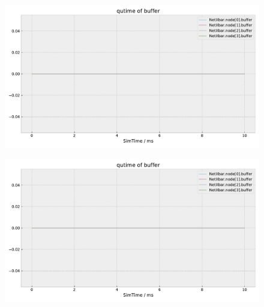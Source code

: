 \documentclass[]{scrartcl}
\begin{document}
\begin{figure}[H]
    \centering
    \includegraphics[width=\columnwidth, page=7]{../../python/results/postopt-General-0}
    \caption{}%
    \label{fig:postopt-arbiter-qtime}
\end{figure}
\begin{figure}[H]
    \centering
    \includegraphics[width=\columnwidth, page=6]{../../python/results/postopt-General-0}
    \caption{}%
    \label{fig:postopt-outbuf-qtime}
\end{figure}
\end{document}
